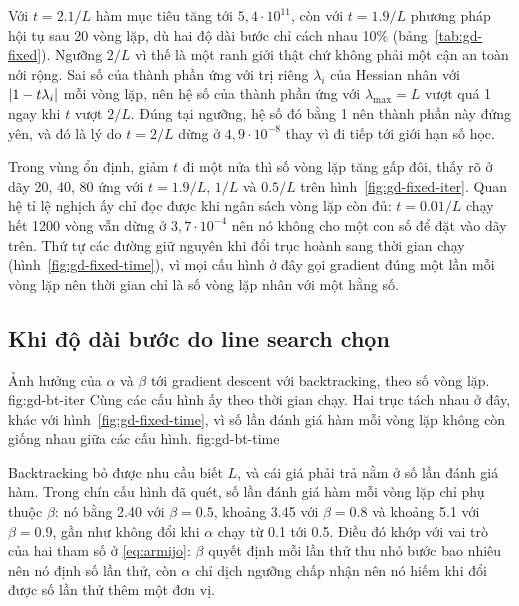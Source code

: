 Với $t = 2.1/L$ hàm mục tiêu tăng tới $5{,}4 \cdot 10^{11}$, còn với $t = 1.9/L$
phương pháp hội tụ sau 20 vòng lặp, dù hai độ dài bước chỉ cách nhau 10\%
(bảng~\ref{tab:gd-fixed}). Ngưỡng $2/L$ vì thế là một ranh giới thật chứ không
phải một cận an toàn nới rộng. Sai số của thành phần ứng với trị riêng
$\lambda_i$ của Hessian nhân với $\lvert1 - t\lambda_i\rvert$ mỗi vòng lặp, nên hệ số
của thành phần ứng với $\lambda_{\max} = L$ vượt quá 1 ngay khi $t$ vượt $2/L$.
Đúng tại ngưỡng, hệ số đó bằng 1 nên thành phần này đứng yên, và đó là lý do
$t = 2/L$ dừng ở $4{,}9 \cdot 10^{-8}$ thay vì đi tiếp tới giới hạn số học.

Trong vùng ổn định, giảm $t$ đi một nửa thì số vòng lặp tăng gấp đôi, thấy rõ ở
dãy 20, 40, 80 ứng với $t = 1.9/L$, $1/L$ và $0.5/L$ trên
hình~\ref{fig:gd-fixed-iter}. Quan hệ tỉ lệ nghịch ấy chỉ đọc được khi ngân sách
vòng lặp còn đủ: $t = 0.01/L$ chạy hết 1200 vòng vẫn dừng ở
$3{,}7 \cdot 10^{-4}$ nên nó không cho một con số để đặt vào dãy trên. Thứ tự các
đường giữ nguyên khi đổi trục hoành sang thời gian chạy
(hình~\ref{fig:gd-fixed-time}), vì mọi cấu hình ở đây gọi gradient đúng một lần
mỗi vòng lặp nên thời gian chỉ là số vòng lặp nhân với một hằng số.

\subsection{Khi độ dài bước do line search chọn}
\label{sec:mech-backtracking}

  {Ảnh hưởng của $\alpha$ và $\beta$ tới gradient descent với backtracking, theo
   số vòng lặp.}
  {fig:gd-bt-iter}
  {Cùng các cấu hình ấy theo thời gian chạy. Hai trục tách nhau ở đây, khác với
   hình~\ref{fig:gd-fixed-time}, vì số lần đánh giá hàm mỗi vòng lặp không còn
   giống nhau giữa các cấu hình.}
  {fig:gd-bt-time}

Backtracking bỏ được nhu cầu biết $L$, và cái giá phải trả nằm ở số lần đánh giá
hàm. Trong chín cấu hình đã quét, số lần đánh giá hàm mỗi vòng lặp chỉ phụ thuộc
$\beta$: nó bằng \num{2.40} với $\beta = 0.5$, khoảng \num{3.45} với
$\beta = 0.8$ và khoảng \num{5.1} với $\beta = 0.9$, gần như không đổi khi
$\alpha$ chạy từ \num{0.1} tới \num{0.5}. Điều đó khớp với vai trò của hai tham
số ở \eqref{eq:armijo}: $\beta$ quyết định mỗi lần thử thu nhỏ bước bao nhiêu nên
nó định số lần thử, còn $\alpha$ chỉ dịch ngưỡng chấp nhận nên nó hiếm khi đổi
được số lần thử thêm một đơn vị.

